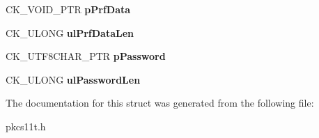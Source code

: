 \begin{DoxyCompactItemize}
C\+K\+\_\+\+V\+O\+I\+D\+\_\+\+P\+TR {\bfseries p\+Prf\+Data}
\item 
\mbox{\label{struct_c_k___p_k_c_s5___p_b_k_d2___p_a_r_a_m_s2_a333ee4ba4300451919a99bfa0b31202d}} 
C\+K\+\_\+\+U\+L\+O\+NG {\bfseries ul\+Prf\+Data\+Len}
\item 
\mbox{\label{struct_c_k___p_k_c_s5___p_b_k_d2___p_a_r_a_m_s2_a9c1f86c66b96fda9146b4179b75e0861}} 
C\+K\+\_\+\+U\+T\+F8\+C\+H\+A\+R\+\_\+\+P\+TR {\bfseries p\+Password}
\item 
\mbox{\label{struct_c_k___p_k_c_s5___p_b_k_d2___p_a_r_a_m_s2_ab6829fe6dc5823e2e4ac25b058afe294}} 
C\+K\+\_\+\+U\+L\+O\+NG {\bfseries ul\+Password\+Len}
\end{DoxyCompactItemize}


The documentation for this struct was generated from the following file\+:\begin{DoxyCompactItemize}
\item 
pkcs11t.\+h\end{DoxyCompactItemize}
